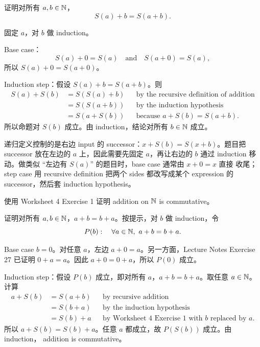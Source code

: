 \begin{exerciseblock}
证明对所有 \(a,b\in\mathbb{N}\)，
\[
  S(a)+b=S(a+b).
\]
\end{exerciseblock}

\begin{solution}
固定 \(a\)，对 \(b\) 做 induction。

Base case：
\[
  S(a)+0=S(a)
  \quad\text{and}\quad
  S(a+0)=S(a),
\]
所以 \(S(a)+0=S(a+0)\)。

Induction step：假设 \(S(a)+b=S(a+b)\)。则
\[
\begin{aligned}
S(a)+S(b)
  &=S(S(a)+b) && \text{by the recursive definition of addition}\\
  &=S(S(a+b)) && \text{by the induction hypothesis}\\
  &=S(a+S(b)) && \text{because } a+S(b)=S(a+b).
\end{aligned}
\]
所以命题对 \(S(b)\) 成立。由 induction，结论对所有 \(b\in\mathbb{N}\) 成立。
\end{solution}

\begin{explanation}
递归定义控制的是右边 input 的 successor：\(x+S(b)=S(x+b)\)。题目把 successor
放在左边的 \(a\) 上，因此需要先固定 \(a\)，再让右边的 \(b\) 通过 induction
移动。做类似 ``左边有 \(S(a)\)'' 的题目时，base case 通常由 \(x+0=x\) 直接
收尾；step case 用 recursive definition 把两个 sides 都改写成某个 expression
的 successor，然后套 induction hypothesis。
\end{explanation}

\begin{exerciseblock}
使用 Worksheet 4 Exercise 1 证明 addition on \(\mathbb{N}\) is commutative。
\end{exerciseblock}

\begin{solution}
证明对所有 \(a,b\in\mathbb{N}\)，\(a+b=b+a\)。按提示，对 \(b\) 做 induction，令
\[
  P(b):\quad \forall a\in\mathbb{N},\ a+b=b+a.
\]

Base case \(b=0\)。对任意 \(a\)，左边 \(a+0=a\)。另一方面，Lecture Notes
Exercise 27 已证明 \(0+a=a\)。因此 \(a+0=0+a\)，所以 \(P(0)\) 成立。

Induction step：假设 \(P(b)\) 成立，即对所有 \(a\)，\(a+b=b+a\)。取任意
\(a\in\mathbb{N}\)。计算
\[
\begin{aligned}
a+S(b)
  &=S(a+b) && \text{by recursive addition}\\
  &=S(b+a) && \text{by the induction hypothesis}\\
  &=S(b)+a && \text{by Worksheet 4 Exercise 1 with } b \text{ replaced by } a.
\end{aligned}
\]
所以 \(a+S(b)=S(b)+a\)。任意 \(a\) 都成立，故 \(P(S(b))\) 成立。由 induction，
addition is commutative。
\end{solution}

